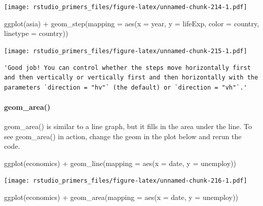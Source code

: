 \documentclass[
]{article}
\newenvironment{Shaded}{\begin{snugshade}}{\end{snugshade}}
\newcommand{\AttributeTok}[1]{\textcolor[rgb]{0.77,0.63,0.00}{#1}}
\newcommand{\FunctionTok}[1]{\textcolor[rgb]{0.00,0.00,0.00}{#1}}
\newcommand{\NormalTok}[1]{#1}
\newcommand{\SpecialCharTok}[1]{\textcolor[rgb]{0.00,0.00,0.00}{#1}}
\begin{document}
\texttt{[image: rstudio\_primers\_files/figure-latex/unnamed-chunk-214-1.pdf]}

\begin{Shaded}
\begin{Highlighting}[]
\FunctionTok{ggplot}\NormalTok{(asia) }\SpecialCharTok{+}
  \FunctionTok{geom\_step}\NormalTok{(}\AttributeTok{mapping =} \FunctionTok{aes}\NormalTok{(}\AttributeTok{x =}\NormalTok{ year, }\AttributeTok{y =}\NormalTok{ lifeExp, }\AttributeTok{color =}\NormalTok{ country, }\AttributeTok{linetype =}\NormalTok{ country))}
\end{Highlighting}
\end{Shaded}

\texttt{[image: rstudio\_primers\_files/figure-latex/unnamed-chunk-215-1.pdf]}

\begin{verbatim}
'Good job! You can control whether the steps move horizontally first and then vertically or vertically first and then horizontally with the parameters `direction = "hv"` (the default) or `direction = "vh"`.'
\end{verbatim}

\hypertarget{geom_area}{%
\paragraph{geom\_area()}\label{geom_area}}

geom\_area() is similar to a line graph, but it fills in the area under
the line. To see geom\_area() in action, change the geom in the plot
below and rerun the code.

\begin{Shaded}
\begin{Highlighting}[]
\FunctionTok{ggplot}\NormalTok{(economics) }\SpecialCharTok{+}
  \FunctionTok{geom\_line}\NormalTok{(}\AttributeTok{mapping =} \FunctionTok{aes}\NormalTok{(}\AttributeTok{x =}\NormalTok{ date, }\AttributeTok{y =}\NormalTok{ unemploy))}
\end{Highlighting}
\end{Shaded}

\texttt{[image: rstudio\_primers\_files/figure-latex/unnamed-chunk-216-1.pdf]}

\begin{Shaded}
\begin{Highlighting}[]
\FunctionTok{ggplot}\NormalTok{(economics) }\SpecialCharTok{+}
  \FunctionTok{geom\_area}\NormalTok{(}\AttributeTok{mapping =} \FunctionTok{aes}\NormalTok{(}\AttributeTok{x =}\NormalTok{ date, }\AttributeTok{y =}\NormalTok{ unemploy))}
\end{Highlighting}
\end{Shaded}
\end{document}
